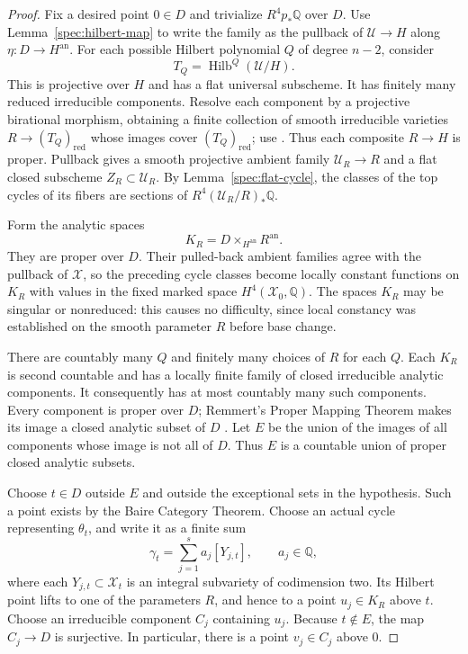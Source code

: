 \begin{proof}
Fix a desired point $0\in D$ and trivialize $R^4p_*\mathbb Q$ over $D$.
Use Lemma~\ref{spec:hilbert-map} to write the family as the pullback of
$\mathcal U\to H$ along $\eta:D\to H^{\mathrm{an}}$.
For each possible Hilbert polynomial $Q$ of degree $n-2$, consider
\[
 T_Q=\operatorname{Hilb}^{Q}(\mathcal U/H).
\]
This is projective over $H$ and has a flat universal subscheme.
It has finitely many reduced irreducible components.  Resolve each
component by a projective birational morphism, obtaining a finite
collection of smooth irreducible varieties $R\to (T_Q)_{\mathrm{red}}$
whose images cover $(T_Q)_{\mathrm{red}}$; use
\cite{Hironaka}.  Thus each composite $R\to H$ is proper.
Pullback gives a smooth projective ambient family $\mathcal U_R\to R$
and a flat closed subscheme $Z_R\subset\mathcal U_R$.  By
Lemma~\ref{spec:flat-cycle}, the classes of the top cycles of its fibers
are sections of $R^4(\mathcal U_R/R)_*\mathbb Q$.

Form the analytic spaces
\[
 K_R=D\times_{H^{\mathrm{an}}}R^{\mathrm{an}}.
\]
They are proper over $D$.  Their pulled-back ambient families agree with
the pullback of $\mathcal X$, so the preceding cycle classes become
locally constant functions on $K_R$ with values in the fixed marked
space $H^4(\mathcal X_0,\mathbb Q)$.  The spaces $K_R$ may be singular
or nonreduced: this causes no difficulty, since local constancy was
established on the smooth parameter $R$ before base change.

There are countably many $Q$ and finitely many choices of $R$ for each
$Q$.  Each $K_R$ is second countable and has a locally finite family of
closed irreducible analytic components.  It consequently has at most
countably many such components.  Every component is proper over $D$;
Remmert's Proper Mapping Theorem makes its image a closed analytic
subset of $D$ \cite[\S7, Satz~1]{Grauert}.  Let $E$ be the union of the images
of all components whose image is not all of $D$.  Thus $E$ is a
countable union of proper closed analytic subsets.

Choose $t\in D$ outside $E$ and outside the exceptional sets in the
hypothesis.  Such a point exists by the Baire Category Theorem.  Choose
an actual cycle representing $\theta_t$, and write it as a finite sum
\[
 \gamma_t=\sum_{j=1}^{s}a_j[Y_{j,t}],
 \qquad a_j\in\mathbb Q,
\]
where each $Y_{j,t}\subset\mathcal X_t$ is an integral subvariety of
codimension two.  Its Hilbert point lifts to one of the parameters $R$,
and hence to a point $u_j\in K_R$ above $t$.  Choose an irreducible
component $C_j$ containing $u_j$.  Because $t\notin E$, the map
$C_j\to D$ is surjective.  In particular, there is a point
$v_j\in C_j$ above $0$.


\end{proof}
